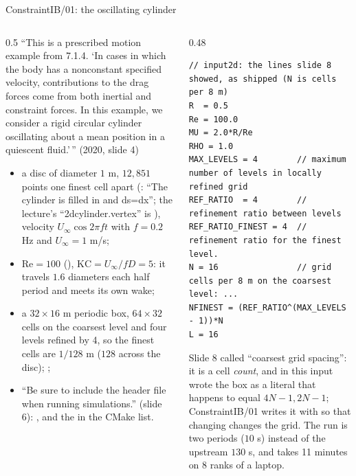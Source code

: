 \documentclass[aspectratio=169,11pt]{beamer}
\begin{document}
\begin{frame}[fragile]{ConstraintIB/01: the oscillating cylinder}
\label{fr:ex01}
\begin{columns}[T,onlytextwidth]
\begin{column}{0.5\textwidth}
\scriptsize ``This is a prescribed motion example from 7.1.4. `In cases in which the body has a nonconstant specified velocity, contributions to the drag forces come from both inertial and constraint forces. In this example, we consider a rigid circular cylinder oscillating about a mean position in a quiescent fluid.'\,'' (2020, slide 4)
\begin{itemize}\scriptsize
  \item a disc of diameter $1$ m, $12{,}851$ points one finest cell apart (: ``The cylinder is filled in and ds=dx''; the lecture's ``2dcylinder.vertex'' is ), velocity $U_\infty\cos 2\pi f t$ with $f = 0.2$ Hz and $U_\infty = 1$ m/s;
  \item $\mathrm{Re} = 100$ (), $\mathrm{KC} = U_\infty/fD = 5$: it travels $1.6$ diameters each half period and meets its own wake;
  \item a $32\times16$ m periodic box, $64\times32$ cells on the coarsest level and four levels refined by 4, so the finest cells are $1/128$ m ($128$ across the disc); ;
  \item ``Be sure to include the header file when running simulations.'' (slide 6): , and the  in the CMake list.
\end{itemize}
\end{column}
\begin{column}{0.48\textwidth}
\begin{lstlisting}[style=inputtiny]
// input2d: the lines slide 8 showed, as shipped (N is cells per 8 m)
R  = 0.5
Re = 100.0
MU = 2.0*R/Re
RHO = 1.0
MAX_LEVELS = 4        // maximum number of levels in locally refined grid
REF_RATIO  = 4        // refinement ratio between levels
REF_RATIO_FINEST = 4  // refinement ratio for the finest level.
N = 16                // grid cells per 8 m on the coarsest level: ...
NFINEST = (REF_RATIO^(MAX_LEVELS - 1))*N
L = 16
\end{lstlisting}
\scriptsize Slide 8 called  ``coarsest grid spacing'': it is a cell \emph{count}, and in this input  wrote the box as a literal  that happens to equal $4N - 1, 2N - 1$; ConstraintIB/01 writes it with  so that changing  changes the grid. The run is two periods ($10$ s) instead of the upstream $130$ s, and takes 11 minutes on 8 ranks of a laptop.
\end{column}
\end{columns}
\end{frame}
\end{document}
